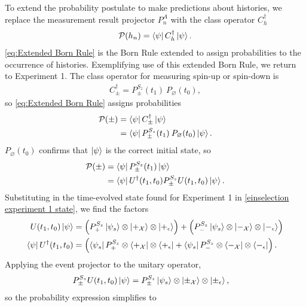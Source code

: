 To extend the probability postulate to make predictions about histories, we replace the measurement result projector $P^A_n$ with the class operator $C_h^\dagger$
\begin{align} \label{eq:Extended Born Rule}
  \mathcal{P}(h_n) = \bra{\psi} C_h^\dagger \ket{\psi}.
\end{align}
\autoref{eq:Extended Born Rule} is the Born Rule extended to assign probabilities to the occurrence of histories. Exemplifying use of this extended Born Rule, we return to Experiment 1. The class operator for measuring spin-up or spin-down is
\begin{align}
  C_\pm^\dagger = P^{S_z}_\pm (t_1) \: P_\varnothing (t_0),
\end{align}
so \autoref{eq:Extended Born Rule} assigns probabilities
\begin{align}
  \mathcal{P}(\pm) &= \bra{\psi} C_\pm^\dagger \ket{\psi} \\ \nonumber
  &= \bra{\psi} P^{S_z}_\pm (t_1) \: P_\varnothing (t_0) \ket{\psi}.
\end{align}
$P_\varnothing (t_0)$ confirms that $\ket{\psi}$ is the correct initial state, so
\begin{align}
  \mathcal{P}(\pm) &= \bra{\psi} P^{S_z}_\pm (t_1) \ket{\psi} \\ \nonumber
  &= \bra{\psi} U^\dagger(t_1, t_0) P^{S_z}_\pm U(t_1, t_0) \ket{\psi}.
\end{align}
Substituting in the time-evolved state found for Experiment 1 in \autoref{einselection experiment 1 state}, we find the factors
\begin{align}
  U(t_1, t_0) \ket{\psi} &= \left(P^{S_z}_+ \ket{\psi_s} \otimes \ket{+_\mathcal{X}} \otimes \ket{+_\epsilon}\right) + \left(P^{S_z}_- \ket{\psi_s} \otimes \ket{-_\mathcal{X}} \otimes \ket{-_\epsilon} \right)\\ \nonumber
  \bra{\psi} U^\dagger(t_1, t_0) &= \left(\bra{\psi_s}P^{S_z}_+ \otimes \bra{+_\mathcal{X}} \otimes \bra{+_\epsilon} + \bra{\psi_s}P^{S_z}_- \otimes \bra{-_\mathcal{X}} \otimes \bra{-_\epsilon}\right).
\end{align}
Applying the event projector to the unitary operator,
\begin{align}
  P^{S_z}_\pm U(t_1, t_0) \ket{\psi} &= P^{S_z}_\pm \ket{\psi_s} \otimes \ket{\pm_\mathcal{X}} \otimes \ket{\pm_\epsilon},
\end{align}
so the probability expression simplifies to
